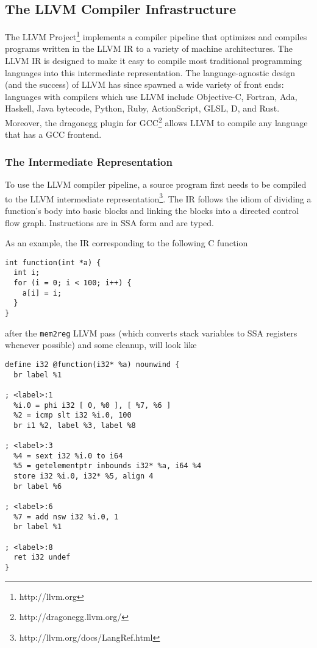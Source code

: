 \subsection{The LLVM Compiler Infrastructure}

The LLVM Project\footnote{http://llvm.org} implements a compiler
pipeline that optimizes and compiles programs written in the LLVM IR
to a variety of machine architectures.  The LLVM IR is designed to
make it easy to compile most traditional programming languages into
this intermediate representation.  The language-agnostic design (and
the success) of LLVM has since spawned a wide variety of front ends:
languages with compilers which use LLVM include Objective-C, Fortran,
Ada, Haskell, Java bytecode, Python, Ruby, ActionScript, GLSL, D, and
Rust.  Moreover, the dragonegg plugin for
GCC\footnote{http://dragonegg.llvm.org/} allows LLVM to compile any
language that has a GCC frontend.

\subsubsection{The Intermediate Representation}

To use the LLVM compiler pipeline, a source program first needs to be
compiled to the LLVM intermediate
representation\footnote{http://llvm.org/docs/LangRef.html}.  The IR
follows the idiom of dividing a function's body into basic blocks and
linking the blocks into a directed control flow graph.  Instructions
are in SSA form and are typed.

As an example, the IR corresponding to the following C function

\begin{verbatim}
int function(int *a) {
  int i;
  for (i = 0; i < 100; i++) {
    a[i] = i;
  }
}
\end{verbatim}

after the \texttt{mem2reg} LLVM pass (which converts stack variables
to SSA registers whenever possible) and some cleanup, will look like

\begin{verbatim}
define i32 @function(i32* %a) nounwind {
  br label %1

; <label>:1
  %i.0 = phi i32 [ 0, %0 ], [ %7, %6 ]
  %2 = icmp slt i32 %i.0, 100
  br i1 %2, label %3, label %8

; <label>:3
  %4 = sext i32 %i.0 to i64
  %5 = getelementptr inbounds i32* %a, i64 %4
  store i32 %i.0, i32* %5, align 4
  br label %6

; <label>:6
  %7 = add nsw i32 %i.0, 1
  br label %1

; <label>:8
  ret i32 undef
}
\end{verbatim}

